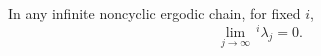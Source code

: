 In any infinite noncyclic ergodic chain, for fixed $i$,
$$\lim_{j \to \infty} \,^{i}\!\lambda_j = 0.$$
